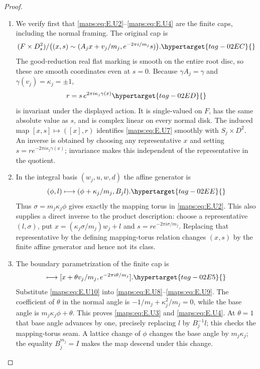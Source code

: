 \documentclass[11pt,a4paper]{article}
\numberwithin{equation}{section}
\theoremstyle{definition}
\begin{document}
\begin{proof}
\begin{enumerate}[label=\arabic*.,leftmargin=*]
\item We verify first that \eqref{maps:eq:E.U2}--\eqref{maps:eq:E.U4} are the finite caps,
including the normal framing.  The original cap is
\begin{equation}
 (F\times D^2_s)/
 \bigl((x,s)\sim(A_jx+v_j/m_j,e^{-2\pi i/m_j}s)\bigr).
 \hypertarget{tag-02EC}{}\label{maps:eq:E.U7}
\end{equation}
The good-reduction real flat marking is smooth on the entire
root disc, so these are smooth coordinates even at $s=0$.
Because $\gamma A_j=\gamma$ and $\gamma(v_j)=\kappa_j=\pm1$,
\begin{equation}
                  r=s\,e^{2\pi i\kappa_j\gamma(x)}
 \hypertarget{tag-02ED}{}\label{maps:eq:E.U8}
\end{equation}
is invariant under the displayed action.  It is single-valued
on $F$, has the same absolute value as $s$, and is complex
linear on every normal disk.  The induced map
$[x,s]\mapsto([x],r)$ identifies \eqref{maps:eq:E.U7} smoothly with
$S_j\times D^2$.  An inverse is obtained by choosing any
representative $x$ and setting
$s=r e^{-2\pi i\kappa_j\gamma(x)}$; invariance makes this
independent of the representative in the quotient.

\item In the integral basis $(w_j,u,w,d)$ the affine generator is
\begin{equation}
                  (\phi,l)\longmapsto
                     (\phi+\kappa_j/m_j,B_jl).
 \hypertarget{tag-02EE}{}\label{maps:eq:E.U9}
\end{equation}
Thus $\sigma=m_j\kappa_j\phi$ gives exactly the mapping torus
in \eqref{maps:eq:E.U2}.  This also supplies a direct inverse to the product
description: choose a representative $(l,\sigma)$, put
$x=(\kappa_j\sigma/m_j)w_j+l$ and
$s=r e^{-2\pi i\sigma/m_j}$.  Replacing that representative
by the defining mapping-torus relation changes $(x,s)$ by
the finite affine generator and hence not its class.

\item The boundary parametrization of the finite cap is
\begin{equation}
 [x,\theta]\longmapsto
       [x+\theta v_j/m_j,e^{-2\pi i\theta/m_j}].
 \hypertarget{tag-02E5}{}\label{maps:eq:E.U10}
\end{equation}
Substitute \eqref{maps:eq:E.U10} into \eqref{maps:eq:E.U8}--\eqref{maps:eq:E.U9}.  The coefficient of
$\theta$ in the normal angle is
$-1/m_j+\kappa_j^2/m_j=0$, while the base angle is
$m_j\kappa_j\phi+\theta$.  This proves \eqref{maps:eq:E.U3} and \eqref{maps:eq:E.U4}.
At $\theta=1$ that base angle advances by one, precisely
replacing $l$ by $B_j^{-1}l$; this checks the mapping-torus
seam.  A lattice change of $\phi$ changes the base angle by $m_j\kappa_j$; the equality $B_j^{m_j}=I$ makes the map descend under this change.


\end{enumerate}
\end{proof}
\end{document}

